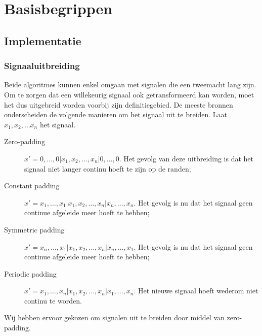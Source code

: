 \chapter{Basisbegrippen}

\section{Implementatie}
\subsection{Signaaluitbreiding}
\label{signaal}
Beide algoritmes kunnen enkel omgaan met signalen die een tweemacht lang zijn. Om te zorgen dat een willekeurig signaal ook getransformeerd kan worden, moet het dus uitgebreid worden voorbij zijn definitiegebied. De meeste bronnen onderscheiden de volgende manieren om het signaal uit te breiden. Laat $x_1, x_2, \ldots x_n$ het signaal.
\begin{description}
\item[Zero-padding] $x' = 0, \ldots, 0| x_1, x_2, \ldots, x_n| 0, \ldots, 0$. Het gevolg van deze uitbreiding is dat het signaal niet langer continu hoeft te zijn op de randen;
\item[Constant padding] $x' = x_1, \ldots, x_1| x_1, x_2, \ldots, x_n| x_n, \ldots, x_n$. Het gevolg is nu dat het signaal geen continue afgeleide meer hoeft te hebben;
\item[Symmetric padding] $x' = x_n, \ldots, x_1| x_1, x_2, \ldots, x_n| x_n, \ldots, x_1$. Het gevolg is nu dat het signaal geen continue afgeleide meer hoeft te hebben;
\item[Periodic padding] $x' = x_1, \ldots, x_n| x_1, x_2, \ldots, x_n| x_1, \ldots, x_n$. Het nieuwe signaal hoeft wederom niet continu te worden.
\end{description}
Wij hebben ervoor gekozen om signalen uit te breiden door middel van zero-padding.

